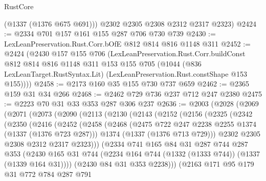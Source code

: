 \begin{lexlean}{RustCore}
\begin{coremodule}
        (@1337 (@1376 @675 @691)))
      @2302
      @2305
      @2308
      @2312
      @2317
      @2323)
@2424 := @2334 @701 @157 @161 @155 @287 @706 @730 @739
@2430 := LexLeanPreservation.Rust.Corr.bOfE @812 @814 @816 @1148 @311
@2452 := @2424
    (@2430
      @157
      @155
      @706
      (LexLeanPreservation.Rust.Corr.buildConst
        @812
        @814
        @816
        @1148
        @311
        @153
        @155
        @705
        (@1044
          (@836 LexLeanTarget.RustSyntax.Lit)
          (LexLeanPreservation.Rust.constShape @153 @155))))
@2458 := @2173 @160 @35 @155 @730 @737 @659
@2462 := @2365 @159 @31 @34 @266
@2468 := @2462 @729 @736 @237 @712 @247 @2380
@2475 := @2223 @70 @31 @33 @353 @287 @306 @237
@2636 := @2003
    (@2028
      (@2069
        (@2071
          (@2073
            (@2090
              (@2113
                (@2130
                  (@2143
                    (@2152
                      (@2156
                        (@2325
                          (@2342
                            (@2350
                              (@2416
                                (@2452
                                  (@2458
                                    (@2468
                                      (@2475 @722 @247 @2238 @2255 @1374 (@1337 (@1376 @723 @287)))
                                      @1374
                                      (@1337 (@1376 @713 @729)))
                                    @2302
                                    @2305
                                    @2308
                                    @2312
                                    @2317
                                    @2323)))
                              (@2334
                                @741
                                @165
                                @84
                                @31
                                @287
                                @744
                                @287
                                @353
                                (@2430
                                  @165
                                  @31
                                  @744
                                  (@2234 @164 @744 (@1332 (@1333 @744)) (@1337 (@1339 @164 @31))))
                                (@2430 @84 @31 @353 @2238)))
                            (@2163
                              @171
                              @95
                              @179
                              @31
                              @772
                              @784
                              @287
                              @791

\end{coremodule}
\end{lexlean}
